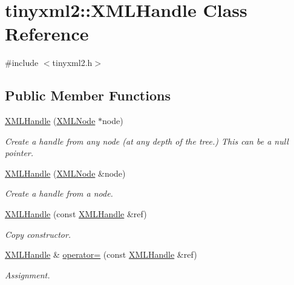 \hypertarget{classtinyxml2_1_1_x_m_l_handle}{}\section{tinyxml2\+:\+:X\+M\+L\+Handle Class Reference}
\label{classtinyxml2_1_1_x_m_l_handle}


{\ttfamily \#include $<$tinyxml2.\+h$>$}

\subsection*{Public Member Functions}
\begin{DoxyCompactItemize}
\item 
\mbox{\hyperlink{classtinyxml2_1_1_x_m_l_handle_a9c240a35c18f053509b4b97ddccd9793}{X\+M\+L\+Handle}} (\mbox{\hyperlink{classtinyxml2_1_1_x_m_l_node}{X\+M\+L\+Node}} $\ast$node)
\begin{DoxyCompactList}\small\item\em Create a handle from any node (at any depth of the tree.) This can be a null pointer. \end{DoxyCompactList}\item 
\mbox{\hyperlink{classtinyxml2_1_1_x_m_l_handle_aa2edbc1c0d3e3e8259bd98de7f1cf500}{X\+M\+L\+Handle}} (\mbox{\hyperlink{classtinyxml2_1_1_x_m_l_node}{X\+M\+L\+Node}} \&node)
\begin{DoxyCompactList}\small\item\em Create a handle from a node. \end{DoxyCompactList}\item 
\mbox{\hyperlink{classtinyxml2_1_1_x_m_l_handle_afd8e01e6018c07347b8e6d80272466aa}{X\+M\+L\+Handle}} (const \mbox{\hyperlink{classtinyxml2_1_1_x_m_l_handle}{X\+M\+L\+Handle}} \&ref)
\begin{DoxyCompactList}\small\item\em Copy constructor. \end{DoxyCompactList}\item 
\mbox{\hyperlink{classtinyxml2_1_1_x_m_l_handle}{X\+M\+L\+Handle}} \& \mbox{\hyperlink{classtinyxml2_1_1_x_m_l_handle_a75b908322bb4b83be3281b6845252b20}{operator=}} (const \mbox{\hyperlink{classtinyxml2_1_1_x_m_l_handle}{X\+M\+L\+Handle}} \&ref)
\begin{DoxyCompactList}\small\item\em Assignment. \end{DoxyCompactList}\item 

\end{DoxyCompactItemize}
